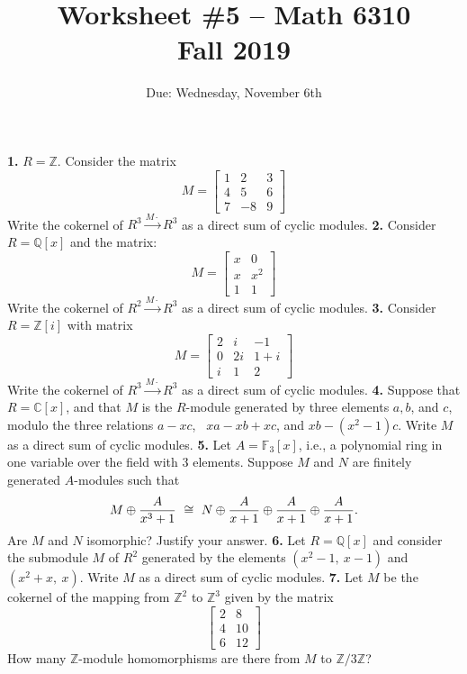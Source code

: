 \documentclass[11pt]{amsart}
\theoremstyle{theorem}
\newcommand{\bF}{\mathbb{F}}
\newcommand{\bQ}{\mathbb{Q}}
\newcommand{\bZ}{\mathbb{Z}}
\begin{document}
\title{Worksheet \#5 -- Math 6310\\Fall 2019}
\author{Due: Wednesday, November 6th}
\maketitle

\noindent
\vskip 9pt
\noindent
{\bf 1.}  $R = \bZ$.  Consider the matrix
\[M = 
\left[ \begin{array}{ccc}  
1 & 2 & 3 \\
4 & 5 & 6 \\
7 & -8 & 9
\end{array}  \right]
\]
Write the cokernel of $R^3 \xrightarrow{M \cdot } R^3$ as a direct sum of cyclic modules.
\newpage
\noindent
{\bf 2.}  Consider $R = \bQ[x]$ and the matrix:
\[ M = 
\left[ \begin{array}{cc}
x & 0  \\
x & x^2  \\
1 & 1 
\end{array}  \right]
\]
Write the cokernel of $R^2 \xrightarrow{M \cdot} R^3$ as a direct sum of cyclic modules.
\newpage
\noindent
{\bf 3.}  Consider $R = \bZ[i]$ with matrix 
\[ M = 
\left[ \begin{array}{ccc}
2 & i & -1 \\
0 & 2i & 1+i \\
i & 1 & 2
\end{array}
\right]
\]
Write the cokernel of $R^3 \xrightarrow{M \cdot} R^3$ as a direct sum of cyclic modules.
\newpage
\noindent
{\bf 4.}  Suppose that $R = \mathbb{C}[x]$, and that $M$ is the $R$-module generated by three elements $a, b$, and $c$, modulo the three relations $a-xc$, \ $x a - xb + xc$, and $xb - (x^2-1)c$.  Write $M$ as a direct sum of cyclic modules.
\newpage
\noindent
{\bf 5.}  Let $A =\bF_3[x]$, i.e., a polynomial ring in one variable over the field with 3 elements.  Suppose $M$ and $N$ are finitely generated $A$-modules such that
\[
M \oplus {A \over {x^3 + 1}}\ \cong\ N \oplus {A \over {x + 1}} \oplus {A \over {x + 1}} \oplus {A \over {x+1}}.
\]
Are $M$ and $N$ isomorphic?  Justify your answer.
\newpage
\noindent
{\bf 6.}  Let $R = \bQ[x]$ and consider the submodule $M$ of $R^2$ generated by the elements $(x^2-1,\ x-1)$ and $(x^2+x,\ x)$.  Write $M$ as a direct sum of cyclic modules.
\newpage
\noindent
{\bf 7.}  Let $M$ be the cokernel of the mapping from $\mathbb{Z}^2$ to $\mathbb{Z}^3$ given by the matrix
$$
\begin{bmatrix}
2 & 8\\ 
4 & 10\\
6 & 12
\end{bmatrix}
$$
How many $\mathbb{Z}$-module homomorphisms are there from $M$ to $\mathbb{Z}/3\mathbb{Z}$?
\end{document}

